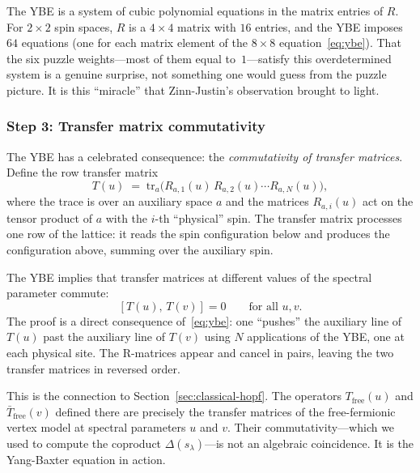 \begin{remark}
The YBE is a system of cubic polynomial equations in the matrix
entries of $R$.  For $2 \times 2$ spin spaces, $R$ is a $4 \times 4$
matrix with $16$ entries, and the YBE imposes $64$ equations (one for
each matrix element of the $8 \times 8$ equation~\eqref{eq:ybe}).
That the six puzzle weights---most of them equal to~$1$---satisfy this
overdetermined system is a genuine surprise, not something one would
guess from the puzzle picture.  It is this ``miracle'' that
Zinn-Justin's observation brought to light.
\end{remark}

\subsubsection*{Step 3: Transfer matrix commutativity}

The YBE has a celebrated consequence: the \emph{commutativity of
transfer matrices}.  Define the row transfer matrix
\begin{equation}
\label{eq:transfer-matrix}
  T(u) \;=\; \mathrm{tr}_a\bigl(
    R_{a,1}(u)\, R_{a,2}(u) \cdots R_{a,N}(u)
  \bigr),
\end{equation}
where the trace is over an auxiliary space $a$ and the matrices
$R_{a,i}(u)$ act on the tensor product of $a$ with the $i$-th
``physical'' spin.  The transfer matrix processes one row of the
lattice: it reads the spin configuration below and produces the
configuration above, summing over the auxiliary spin.

The YBE implies that transfer matrices at different values of the
spectral parameter commute:
\begin{equation}
\label{eq:transfer-commute}
  [T(u),\, T(v)] = 0 \qquad \text{for all } u, v.
\end{equation}
The proof is a direct consequence of~\eqref{eq:ybe}: one ``pushes''
the auxiliary line of $T(u)$ past the auxiliary line of $T(v)$ using
$N$ applications of the YBE, one at each physical site.  The
R-matrices appear and cancel in pairs, leaving the two transfer
matrices in reversed order.

This is the connection to Section~\ref{sec:classical-hopf}.  The
operators $T_{\mathrm{free}}(u)$ and $\bar{T}_{\mathrm{free}}(v)$
defined there are precisely the transfer matrices of the
free-fermionic vertex model at spectral parameters $u$ and $v$.
Their commutativity---which we used to compute the coproduct
$\Delta(s_\lambda)$---is not an algebraic coincidence.  It is the
Yang-Baxter equation in action.

